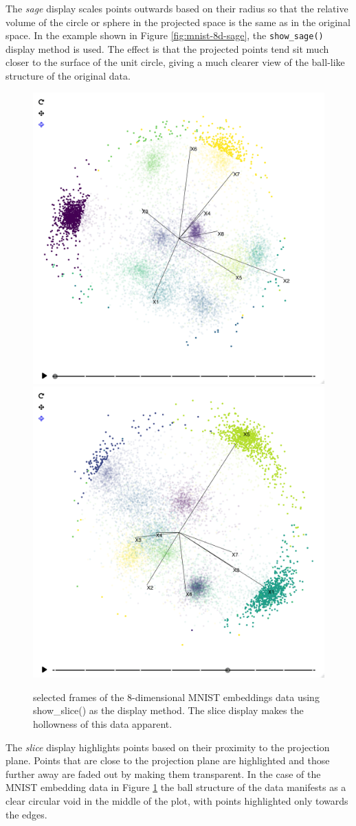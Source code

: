 The \emph{sage} display scales points outwards based on their radius so that the relative volume of the circle or sphere in the projected space is the same as in the original space. In the example shown in Figure \ref{fig:mnist-8d-sage}, the \texttt{show\_sage()} display method is used. The effect is that the projected points tend sit much closer to the surface of the unit circle, giving a much clearer view of the ball-like structure of the original data.

\begin{figure}

{\centering \includegraphics[width=0.49\linewidth]{figures/mnist/mnist-8d-slice-1} \includegraphics[width=0.49\linewidth]{figures/mnist/mnist-8d-slice-2} 

}

\caption{selected frames of the 8-dimensional MNIST embeddings data using show\_slice() as the display method. The slice display makes the hollowness of this data apparent.}\label{fig:mnist-8d-slice}
\end{figure}

The \emph{slice} display highlights points based on their proximity to the projection plane. Points that are close to the projection plane are highlighted and those further away are faded out by making them transparent. In the case of the MNIST embedding data in Figure \ref{fig:mnist-8d-slice} the ball structure of the data manifests as a clear circular void in the middle of the plot, with points highlighted only towards the edges.

